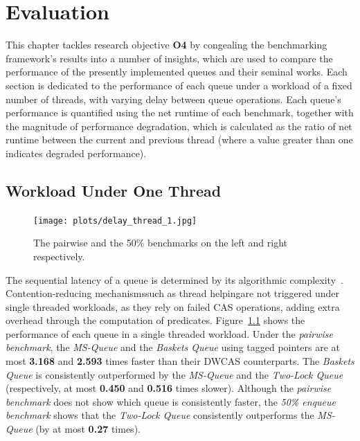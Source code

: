 \chapter{Evaluation\label{chap:evaluation}}
This chapter tackles research objective \textbf{O4} by congealing the
benchmarking framework's results into a number of insights, which are used to
compare the performance of the presently implemented queues and their seminal works. 
Each section is dedicated to the performance of each
queue under a workload of a fixed number of threads, with varying
delay between queue operations.
Each queue's performance is quantified using the net runtime of each benchmark,
together with the magnitude of performance degradation, which is
calculated as the ratio of net runtime between the current and previous thread
(where a value greater than one indicates degraded performance).

\section{Workload Under One Thread}

\begin{figure}[!ht]
    \texttt{[image: plots/delay\_thread\_1.jpg]}
    \caption{The pairwise and the 50\% benchmarks on the left and right respectively.}
    \label{fig:perf_1_thread}
\end{figure}

The sequential latency of a queue is determined by its algorithmic
complexity~\citep{valois1995datastructures}. Contention-reducing
mechanisms\textemdash such as thread helping\textemdash are not triggered under
single threaded workloads, as they rely on failed CAS operations, adding
extra overhead through the computation of predicates.
Figure~\ref{fig:perf_1_thread} shows the performance of each queue in a single
threaded workload. Under the \emph{pairwise benchmark}, the \emph{MS-Queue} and
the \emph{Baskets Queue} using tagged pointers are at most \textbf{3.168} and
\textbf{2.593} times faster than their DWCAS counterparts. 
The \emph{Baskets Queue} is consistently outperformed by the \emph{MS-Queue}
and the \emph{Two-Lock Queue} (respectively, at most \textbf{0.450} and
\textbf{0.516} times slower). Although the \emph{pairwise benchmark} does not
show which queue is consistently faster, the \emph{50\% enqueue benchmark}
shows that the \emph{Two-Lock Queue} consistently outperforms the
\emph{MS-Queue} (by at most \textbf{0.27} times).

